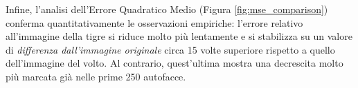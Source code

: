\documentclass[a4paper,11pt]{article}
\begin{document}
\noindent Infine, l’analisi dell’Errore Quadratico Medio (Figura \ref{fig:mse_comparison}) conferma quantitativamente le osservazioni empiriche: l’errore relativo all’immagine della tigre si riduce molto più lentamente e si stabilizza su un valore di \textit{differenza dall’immagine originale} circa 15 volte superiore rispetto a quello dell’immagine del volto. Al contrario, quest’ultima mostra una decrescita molto più marcata già nelle prime 250 autofacce.
\end{document}
